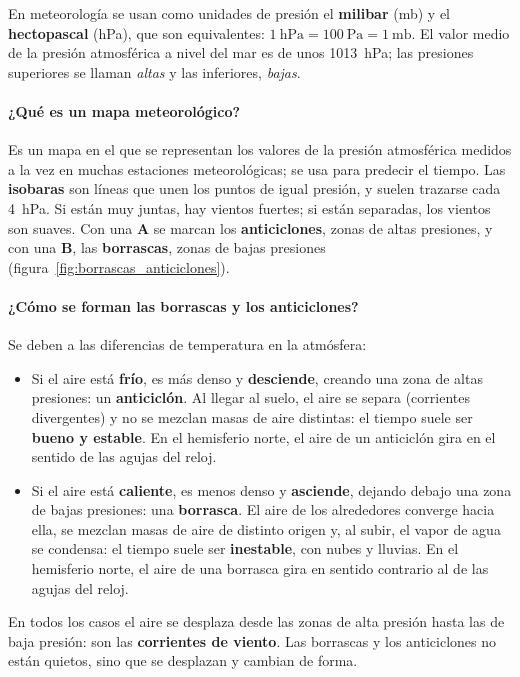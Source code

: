 En meteorología se usan como unidades de presión el \textbf{milibar} (mb) y el \textbf{hectopascal} (\unit{\hecto\pascal}), que son equivalentes: \(\qty{1}{\hecto\pascal} = \qty{100}{\pascal} = 1~\text{mb}\). El valor medio de la presión atmosférica a nivel del mar es de unos \qty{1013}{\hecto\pascal}; las presiones superiores se llaman \emph{altas} y las inferiores, \emph{bajas}.

\paragraph{¿Qué es un mapa meteorológico?} Es un mapa en el que se representan los valores de la presión atmosférica medidos a la vez en muchas estaciones meteorológicas; se usa para predecir el tiempo. Las \textbf{isobaras} son líneas que unen los puntos de igual presión, y suelen trazarse cada \qty{4}{\hecto\pascal}. Si están muy juntas, hay vientos fuertes; si están separadas, los vientos son suaves. Con una \textbf{A} se marcan los \textbf{anticiclones}, zonas de altas presiones, y con una \textbf{B}, las \textbf{borrascas}, zonas de bajas presiones (figura~\ref{fig:borrascas_anticiclones}).

\paragraph{¿Cómo se forman las borrascas y los anticiclones?} Se deben a las diferencias de temperatura en la atmósfera:
\begin{itemize}
    \item Si el aire está \textbf{frío}, es más denso y \textbf{desciende}, creando una zona de altas presiones: un \textbf{anticiclón}. Al llegar al suelo, el aire se separa (corrientes divergentes) y no se mezclan masas de aire distintas: el tiempo suele ser \textbf{bueno y estable}. En el hemisferio norte, el aire de un anticiclón gira en el sentido de las agujas del reloj.
    \item Si el aire está \textbf{caliente}, es menos denso y \textbf{asciende}, dejando debajo una zona de bajas presiones: una \textbf{borrasca}. El aire de los alrededores converge hacia ella, se mezclan masas de aire de distinto origen y, al subir, el vapor de agua se condensa: el tiempo suele ser \textbf{inestable}, con nubes y lluvias. En el hemisferio norte, el aire de una borrasca gira en sentido contrario al de las agujas del reloj.
\end{itemize}
En todos los casos el aire se desplaza desde las zonas de alta presión hasta las de baja presión: son las \textbf{corrientes de viento}. Las borrascas y los anticiclones no están quietos, sino que se desplazan y cambian de forma.


